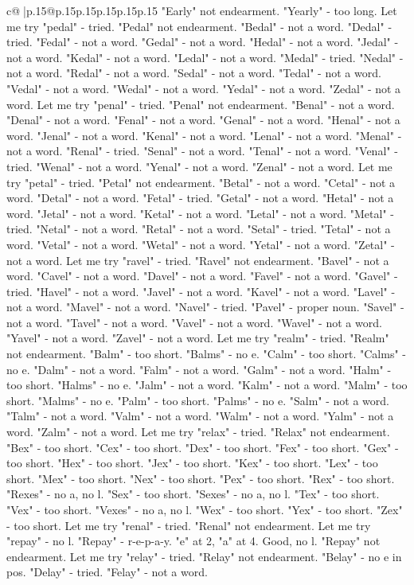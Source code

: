 \documentclass{article}
\begin{document}
{\begin{supertabular}{c@{$\;$}|p{.15\linewidth}@{}p{.15\linewidth}p{.15\linewidth}p{.15\linewidth}p{.15\linewidth}p{.15\linewidth}}
{{{"Early" not endearment. "Yearly" {-} too long. Let me try "pedal" {-} tried. "Pedal" not endearment. "Bedal" {-} not a word. "Dedal" {-} tried. "Fedal" {-} not a word. "Gedal" {-} not a word. "Hedal" {-} not a word. "Jedal" {-} not a word. "Kedal" {-} not a word. "Ledal" {-} not a word. "Medal" {-} tried. "Nedal" {-} not a word. "Redal" {-} not a word. "Sedal" {-} not a word. "Tedal" {-} not a word. "Vedal" {-} not a word. "Wedal" {-} not a word. "Yedal" {-} not a word. "Zedal" {-} not a word. Let me try "penal" {-} tried. "Penal" not endearment. "Benal" {-} not a word. "Denal" {-} not a word. "Fenal" {-} not a word. "Genal" {-} not a word. "Henal" {-} not a word. "Jenal" {-} not a word. "Kenal" {-} not a word. "Lenal" {-} not a word. "Menal" {-} not a word. "Renal" {-} tried. "Senal" {-} not a word. "Tenal" {-} not a word. "Venal" {-} tried. "Wenal" {-} not a word. "Yenal" {-} not a word. "Zenal" {-} not a word. Let me try "petal" {-} tried. "Petal" not endearment. "Betal" {-} not a word. "Cetal" {-} not a word. "Detal" {-} not a word. "Fetal" {-} tried. "Getal" {-} not a word. "Hetal" {-} not a word. "Jetal" {-} not a word. "Ketal" {-} not a word. "Letal" {-} not a word. "Metal" {-} tried. "Netal" {-} not a word. "Retal" {-} not a word. "Setal" {-} tried. "Tetal" {-} not a word. "Vetal" {-} not a word. "Wetal" {-} not a word. "Yetal" {-} not a word. "Zetal" {-} not a word. Let me try "ravel" {-} tried. "Ravel" not endearment. "Bavel" {-} not a word. "Cavel" {-} not a word. "Davel" {-} not a word. "Favel" {-} not a word. "Gavel" {-} tried. "Havel" {-} not a word. "Javel" {-} not a word. "Kavel" {-} not a word. "Lavel" {-} not a word. "Mavel" {-} not a word. "Navel" {-} tried. "Pavel" {-} proper noun. "Savel" {-} not a word. "Tavel" {-} not a word. "Vavel" {-} not a word. "Wavel" {-} not a word. "Yavel" {-} not a word. "Zavel" {-} not a word. Let me try "realm" {-} tried. "Realm" not endearment. "Balm" {-} too short. "Balms" {-} no e. "Calm" {-} too short. "Calms" {-} no e. "Dalm" {-} not a word. "Falm" {-} not a word. "Galm" {-} not a word. "Halm" {-} too short. "Halms" {-} no e. "Jalm" {-} not a word. "Kalm" {-} not a word. "Malm" {-} too short. "Malms" {-} no e. "Palm" {-} too short. "Palms" {-} no e. "Salm" {-} not a word. "Talm" {-} not a word. "Valm" {-} not a word. "Walm" {-} not a word. "Yalm" {-} not a word. "Zalm" {-} not a word. Let me try "relax" {-} tried. "Relax" not endearment. "Bex" {-} too short. "Cex" {-} too short. "Dex" {-} too short. "Fex" {-} too short. "Gex" {-} too short. "Hex" {-} too short. "Jex" {-} too short. "Kex" {-} too short. "Lex" {-} too short. "Mex" {-} too short. "Nex" {-} too short. "Pex" {-} too short. "Rex" {-} too short. "Rexes" {-} no a, no l. "Sex" {-} too short. "Sexes" {-} no a, no l. "Tex" {-} too short. "Vex" {-} too short. "Vexes" {-} no a, no l. "Wex" {-} too short. "Yex" {-} too short. "Zex" {-} too short. Let me try "renal" {-} tried. "Renal" not endearment. Let me try "repay" {-} no l. "Repay" {-} r{-}e{-}p{-}a{-}y. "e" at 2, "a" at 4. Good, no l. "Repay" not endearment. Let me try "relay" {-} tried. "Relay" not endearment. "Belay" {-} no e in pos. "Delay" {-} tried. "Felay" {-} not a word. }}}
\end{supertabular}}
\end{document}
